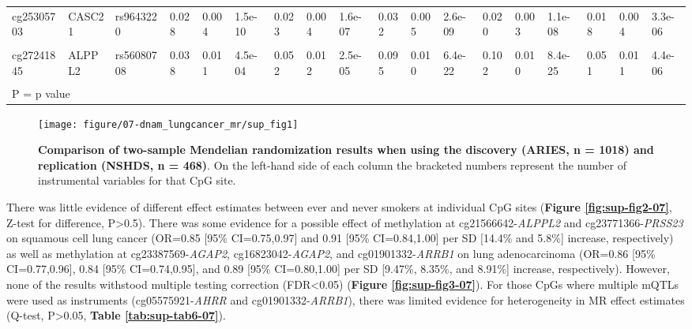 \documentclass[11pt,oneside]{bristolthesis}
\begin{document}
\begin{landscape}
\begin{table}[!h]
{\begin{tabular}[t]{llllllllllllllllll}
cg25305703 & CASC21 & rs9643220 & 0.028 & 0.004 & 1.5e-10 & 0.023 & 0.004 & 1.6e-07 & 0.032 & 0.005 & 2.6e-09 & 0.020 & 0.003 & 1.1e-08 & 0.018 & 0.004 & 3.3e-06\\
\cellcolor{gray!6}{cg26963277} & \cellcolor{gray!6}{KCNQ1} & \cellcolor{gray!6}{rs463924} & \cellcolor{gray!6}{-0.018} & \cellcolor{gray!6}{0.002} & \cellcolor{gray!6}{1.6e-14} & \cellcolor{gray!6}{-0.015} & \cellcolor{gray!6}{0.003} & \cellcolor{gray!6}{1.2e-08} & \cellcolor{gray!6}{-0.008} & \cellcolor{gray!6}{0.003} & \cellcolor{gray!6}{5.6e-03} & \cellcolor{gray!6}{-0.012} & \cellcolor{gray!6}{0.002} & \cellcolor{gray!6}{6.3e-09} & \cellcolor{gray!6}{-0.015} & \cellcolor{gray!6}{0.002} & \cellcolor{gray!6}{7.5e-12}\\
\addlinespace
cg27241845 & ALPPL2 & rs56080708 & 0.038 & 0.011 & 4.5e-04 & 0.052 & 0.012 & 2.5e-05 & 0.095 & 0.010 & 6.4e-22 & 0.102 & 0.010 & 8.4e-25 & 0.051 & 0.011 & 4.4e-06\\
\bottomrule
\multicolumn{18}{l}{\textsuperscript{} P = p value}\\
\end{tabular}}
\end{table}
\end{landscape}



\begin{figure}

{\centering \texttt{[image: figure/07-dnam\_lungcancer\_mr/sup\_fig1]} 

}

\caption[Comparison of two-sample Mendelian randomization results when using the discovery (ARIES, n = 1018) and replication (NSHDS, n = 468)]{\textbf{Comparison of two-sample Mendelian randomization results when using the discovery (ARIES, n = 1018) and replication (NSHDS, n = 468)}. On the left-hand side of each column the bracketed numbers represent the number of instrumental variables for that CpG site.}\label{fig:sup-fig1-07}
\end{figure}
There was little evidence of different effect estimates between ever and never smokers at individual CpG sites (\textbf{Figure \ref{fig:sup-fig2-07}}, Z-test for difference, P\textgreater0.5). There was some evidence for a possible effect of methylation at cg21566642-\emph{ALPPL2} and cg23771366-\emph{PRSS23} on squamous cell lung cancer (OR=0.85 {[}95\% CI=0.75,0.97{]} and 0.91 {[}95\% CI=0.84,1.00{]} per SD {[}14.4\% and 5.8\%{]} increase, respectively) as well as methylation at cg23387569-\emph{AGAP2}, cg16823042-\emph{AGAP2}, and cg01901332-\emph{ARRB1} on lung adenocarcinoma (OR=0.86 {[}95\% CI=0.77,0.96{]}, 0.84 {[}95\% CI=0.74,0.95{]}, and 0.89 {[}95\% CI=0.80,1.00{]} per SD {[}9.47\%, 8.35\%, and 8.91\%{]} increase, respectively). However, none of the results withstood multiple testing correction (FDR\textless0.05) (\textbf{Figure \ref{fig:sup-fig3-07}}). For those CpGs where multiple mQTLs were used as instruments (cg05575921-\emph{AHRR} and cg01901332-\emph{ARRB1}), there was limited evidence for heterogeneity in MR effect estimates (Q-test, P\textgreater0.05, \textbf{Table \ref{tab:sup-tab6-07}}).
\end{document}
